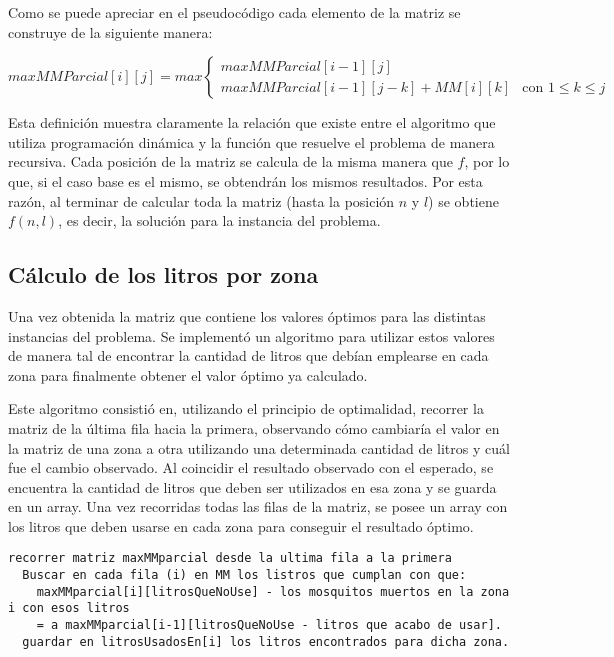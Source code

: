\documentclass[a4paper,11pt] {article}
\begin{document}
Como se puede apreciar en el pseudoc\'odigo cada elemento de la matriz se construye de la siguiente manera:

$ maxMMParcial[i][j] = max \left\{ \begin{array}{ll}
         maxMMParcial[i-1][j] & \mbox{$$}\\
        maxMMParcial[i-1][j-k] + MM[i][k] & \mbox{con $1 \leq k \leq j$}\end{array} \right. $


Esta definici\'on muestra claramente la relaci\'on que existe entre el algoritmo que utiliza programaci\'on din\'amica y la funci\'on que resuelve el problema de manera recursiva. Cada posici\'on de la matriz se calcula de la misma manera que $f$, por lo que, si el caso base es el mismo, se obtendr\'an los mismos resultados. Por esta raz\'on, al terminar de calcular toda la matriz (hasta la posici\'on $n$ y $l$) se obtiene $f(n,l)$, es decir, la soluci\'on para la instancia del problema.

\subsection*{Cálculo de los litros por zona}

Una vez obtenida la matriz que contiene los valores óptimos para las distintas instancias del problema. Se implementó un algoritmo para utilizar estos valores de manera tal de encontrar la cantidad de litros que debían emplearse en cada zona para finalmente obtener el valor óptimo ya calculado.

Este algoritmo consistió en, utilizando el principio de optimalidad, recorrer la matriz de la última fila hacia la primera, observando cómo cambiaría el valor en la matriz de una zona a otra utilizando una determinada cantidad de litros y cuál fue el cambio observado. Al coincidir el resultado observado con el esperado, se encuentra la cantidad de litros que deben ser utilizados en esa zona y se guarda en un array. Una vez recorridas todas las filas de la matriz, se posee un array con los litros que deben usarse en cada zona para conseguir el resultado óptimo.

\begin{verbatim}
recorrer matriz maxMMparcial desde la ultima fila a la primera
  Buscar en cada fila (i) en MM los listros que cumplan con que:
    maxMMparcial[i][litrosQueNoUse] - los mosquitos muertos en la zona i con esos litros
    = a maxMMparcial[i-1][litrosQueNoUse - litros que acabo de usar].
  guardar en litrosUsadosEn[i] los litros encontrados para dicha zona.
\end{verbatim}
\end{document}
